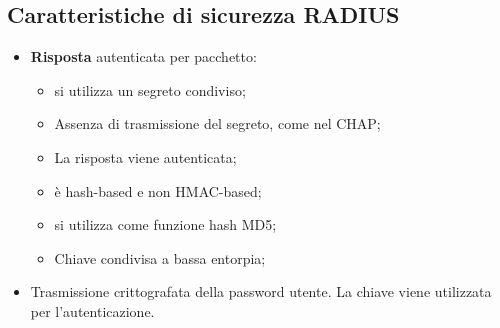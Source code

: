 \documentclass{article}
\theoremstyle{remark}
\begin{document}
\subsection{Caratteristiche di sicurezza RADIUS}
\begin{itemize}
	\item \textbf{Risposta} autenticata per pacchetto:\begin{itemize}
		      \item si utilizza un segreto condiviso;
		      \item Assenza di trasmissione del segreto, come nel CHAP;
		      \item La risposta viene autenticata;
		      \item è hash-based e non HMAC-based;
		      \item si utilizza come funzione hash MD5;
		      \item Chiave condivisa a bassa entorpia;
	      \end{itemize}
	\item Trasmissione crittografata della password utente. La chiave viene utilizzata per l'autenticazione.
\end{itemize}
\end{document}
